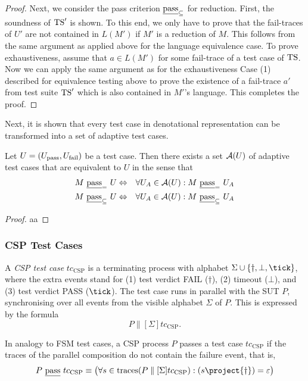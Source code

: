 \begin{proof}
Next, we consider the pass criterion $\underline{\text{pass}}_\subseteq$ for reduction. First, the soundness of
${\text{TS}}'$ is shown. To this end, we only have to prove that the fail-traces of $U'$ are not contained in $L(M')$ if $M'$ is a reduction of $M$. This follows from the same argument as applied above for the language equivalence case. To prove exhaustiveness, 
assume that $a\in L(M')$ for some fail-trace of a test case of ${\text{TS}}$. Now we can
apply the same argument as for the exhaustiveness Case (1) described for equivalence testing above to prove the existence of a fail-trace $a'$ from test suite ${\text{TS}}'$ which is also contained in $M'$'s language. This completes the proof. 
\end{proof}

Next, it is shown that every test case in denotational representation can be
transformed into a set of adaptive test cases.

\begin{theorem}
Let $U = ({U}_\text{pass}, {U}_\text{fail})$ be a test case. Then there exists a set ${\cal A}(U)$
of adaptive test cases that are equivalent to $U$ in the sense that 
\begin{eqnarray*}
M\ \passeq\ U & \Leftrightarrow & \forall U_A\in {\cal A}(U): M\ \passeq\ U_A
\\
M\ \passred\ U & \Leftrightarrow & \forall U_A\in {\cal A}(U): M\ \passred\ U_A
\end{eqnarray*}
\end{theorem}
\begin{proof}
aa
\end{proof}



\subsubsection{CSP Test Cases}
\label{sec:csptc}
A \emph{CSP test case} $tc_\text{CSP}$  is a terminating process with alphabet
$\Sigma\cup\{\dag,\bot,\tick \}$, where the extra events stand for
(1) test  verdict FAIL ($\dag$), (2) timeout ($\bot$), and (3) test
 verdict PASS ($\tick$). The test case runs in parallel with the SUT $P$,
 synchronising over all events from the visible alphabet $\Sigma$ of $P$. This is
 expressed by the formula
 \[
 P\parallel[\Sigma] tc_\text{CSP}.
 \]

 In analogy to FSM test cases, a CSP process $P$ passes a test case $tc_\text{CSP}$
 if the traces of the parallel composition do not contain the failure event, that is,
 \[
 P\ \pass\ tc_\text{CSP} \equiv \big(
 \forall s\in\trc(P\parallel[\Sigma] tc_\text{CSP}): (s\project \{\dag\}) = \varepsilon
 \big)
 \]


